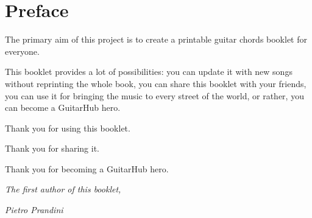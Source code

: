 % 
% 
% 
% 

\section*{Preface}
The primary aim of this project is to create a printable guitar chords booklet for everyone.\par
\medskip
This booklet provides a lot of possibilities: you can update it with new songs without reprinting the whole book,
you can share this booklet with your friends, you can use it for bringing the music to every street of the world, or rather, you can become a GuitarHub hero.\par
\medskip
Thank you for using this booklet.\par
\smallskip
Thank you for sharing it.\par
\smallskip
Thank you for becoming a GuitarHub hero.\par
\bigskip
\begin{flushright}
	{\small{\textit{The first author of this booklet,}}}\par
	\medskip
	{\large{\textit{\rmfamily Pietro Prandini}}}\par
\end{flushright}
\newpage
